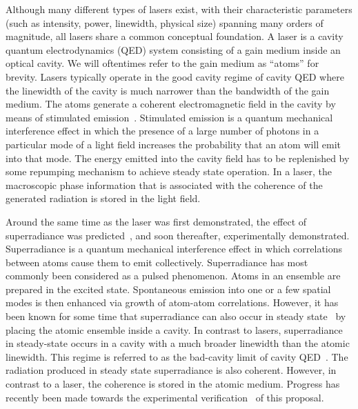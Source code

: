 \documentclass[aps,
twocolumn,
superscriptaddress,groupedaddress]{revtex4}
\begin{document}
Although many different types of lasers exist, with their characteristic
parameters (such as intensity, power, linewidth, physical size) spanning
many orders of magnitude, all lasers share a common conceptual
foundation.  A laser is a cavity quantum electrodynamics (QED) system
consisting of a gain medium inside an optical cavity.  We will
oftentimes refer to the gain medium as ``atoms'' for brevity.  Lasers
typically operate in the good cavity regime of cavity QED where the
linewidth of the cavity is much narrower than the bandwidth of the gain
medium.  The atoms generate a coherent electromagnetic field in the
cavity by means of stimulated emission~\cite{PhysRev.112.1940}.
Stimulated emission is a quantum mechanical interference effect in which
the presence of a large number of photons in a particular mode of a
light field increases the probability that an atom will emit into that
mode. The energy emitted into the cavity field has to be replenished by
some repumping mechanism to achieve steady state operation. In a laser,
the macroscopic phase information that is associated with the coherence
of the generated radiation is stored in the light field.

Around the same time as the laser was first demonstrated, the effect
of superradiance was predicted~\cite{PhysRev.93.99}, and soon
thereafter, experimentally demonstrated.  Superradiance is a quantum
mechanical interference effect in which correlations between atoms
cause them to emit collectively.  Superradiance has most commonly been
considered as a pulsed phenomenon.  Atoms in an ensemble are prepared
in the excited state.  Spontaneous emission into one or a few spatial
modes is then enhanced via growth of atom-atom correlations.
However, it has been known for some time that superradiance can also
occur in steady state~\cite{PhysRevLett.102.163601,
  PhysRevA.81.033847, PhysRevA.81.063827,PhysRevLett.89.253003} by
placing the atomic ensemble inside a cavity.  In contrast to lasers,
superradiance in steady-state occurs in a cavity with a much broader
linewidth than the atomic linewidth.  This regime is referred to as
the bad-cavity limit of cavity QED~\cite{PhysRevA.51.809,
  PhysRevLett.72.3815, ChenDeliciousLaser, HakenLaser,
  HakenLaserBook}.  The radiation produced in steady state
superradiance is also coherent.  However, in contrast to a laser, the
coherence is stored in the atomic medium.  Progress has recently been
made towards the experimental
verification~\cite{ThompsonPaper,bohnet2012relaxation} of this proposal.
\end{document}
